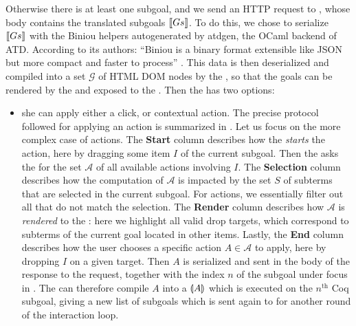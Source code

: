Otherwise there is at least one subgoal, and we send an  HTTP
request to , whose body contains the translated subgoals $\llbracket Gs \rrbracket$. To
do this, we chose to serialize $\llbracket Gs \rrbracket$ with the Biniou helpers
autogenerated by atdgen, the OCaml backend of ATD. According to its authors:
``Biniou is a binary format extensible like JSON but more compact and faster to
process'' . This data is then deserialized and compiled into a
set $\mathcal{G}$ of HTML DOM nodes by the , so that the goals
can be rendered by the  and exposed to the .
Then the  has two options:
\begin{itemize}
  \item she can apply either a click,  or contextual action. The precise protocol followed for applying an action is
  summarized in . Let us focus on the more complex case
  of  actions. The \textbf{Start} column describes how the 
  \emph{starts} the action, here by dragging some item $I$ of the current
  subgoal. Then the  asks the  for the set
  $\mathcal{A}$ of all available  actions involving $I$. The
  \textbf{Selection} column describes how the computation of $\mathcal{A}$ is
  impacted by the set $S$ of subterms that are selected in the current subgoal.
  For  actions, we essentially filter out all  that do not match the
  selection. The \textbf{Render} column describes how $\mathcal{A}$ is
  \emph{rendered} to the : here we highlight all valid drop
  targets, which correspond to subterms of the current goal located in other
  items. Lastly, the \textbf{End} column describes how
  the user chooses a specific action $A \in \mathcal{A}$ to apply, here by
  dropping $I$ on a given target. Then $A$ is serialized and sent in the body of
  the response to the  request, together with the index $n$ of
  the subgoal under focus in . The  can therefore compile
  $A$ into a  $\llparenthesis A \rrparenthesis$ which is executed on the $n^{\text{th}}$ Coq
  subgoal, giving a new list of subgoals which is sent again to  for
  another round of the interaction loop.


\end{itemize}
